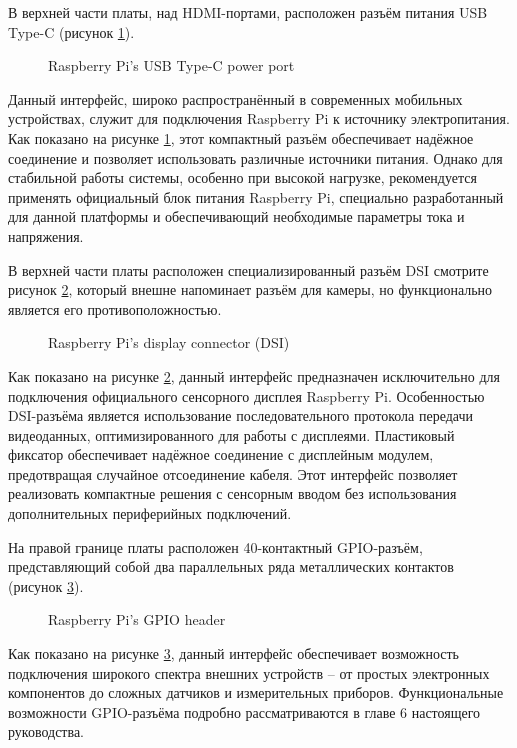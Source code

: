 В верхней части платы, над HDMI-портами, расположен разъём питания USB Type-C (рисунок \ref{fig:typeC}).

\begin{figure}[H]
	\centering
	\caption{Raspberry Pi’s USB Type-C power port}
	\label{fig:typeC}
\end{figure}

Данный интерфейс, широко распространённый в современных мобильных устройствах, служит для подключения Raspberry Pi к источнику электропитания. Как показано на рисунке \ref{fig:typeC}, этот компактный разъём обеспечивает надёжное соединение и позволяет использовать различные источники питания. Однако для стабильной работы системы, особенно при высокой нагрузке, рекомендуется применять официальный блок питания Raspberry Pi, специально разработанный для данной платформы и обеспечивающий необходимые параметры тока и напряжения.


В верхней части платы расположен специализированный разъём DSI смотрите рисунок \ref{fig:display}, который внешне напоминает разъём для камеры, но функционально является его противоположностью.

\begin{figure}[H]
	\centering
	\caption{Raspberry Pi’s display connector (DSI)}
	\label{fig:display}
\end{figure}

Как показано на рисунке \ref{fig:display}, данный интерфейс предназначен исключительно для подключения официального сенсорного дисплея Raspberry Pi. Особенностью DSI-разъёма является использование последовательного протокола передачи видеоданных, оптимизированного для работы с дисплеями. Пластиковый фиксатор обеспечивает надёжное соединение с дисплейным модулем, предотвращая случайное отсоединение кабеля. Этот интерфейс позволяет реализовать компактные решения с сенсорным вводом без использования дополнительных периферийных подключений.

На правой границе платы расположен 40-контактный GPIO-разъём, представляющий собой два параллельных ряда металлических контактов (рисунок \ref{fig:gpio}).

\begin{figure}[H]
	\centering
	\caption{Raspberry Pi’s GPIO header}
	\label{fig:gpio}
\end{figure}

Как показано на рисунке \ref{fig:gpio}, данный интерфейс обеспечивает возможность подключения широкого спектра внешних устройств -- от простых электронных компонентов  до сложных датчиков и измерительных приборов. Функциональные возможности GPIO-разъёма подробно рассматриваются в главе 6 настоящего руководства.

